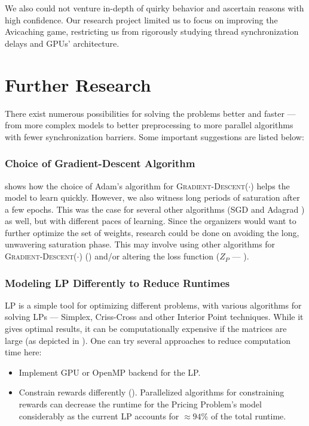 We also could not venture in-depth of quirky behavior and ascertain reasons with high confidence. Our research project limited us to focus on improving the Avicaching game, restricting us from rigorously studying thread synchronization delays and GPUs' architecture.

\section{Further Research}
There exist numerous possibilities for solving the problems better and faster --- from more complex models to better preprocessing to more parallel algorithms with fewer synchronization barriers. Some important suggestions are listed below:

\subsubsection{Choice of Gradient-Descent Algorithm}
 shows how the choice of Adam's algorithm \cite{Adam} for \textsc{Gradient-Descent}($\cdot$) helps the model to learn quickly. However, we also witness long periods of saturation after a few epochs. This was the case for several other algorithms (SGD \cite{SGD} and Adagrad \cite{Adagrad}) as well, but with different paces of learning. Since the organizers would want to further optimize the set of weights, research could be done on avoiding the long, unwavering saturation phase. This may involve using other algorithms for \textsc{Gradient-Descent}($\cdot$) () and/or altering the loss function ($Z_P$ --- ).

\subsubsection{Modeling LP Differently to Reduce Runtimes}
LP is a simple tool for optimizing different problems, with various algorithms for solving LPs --- Simplex, Criss-Cross and other Interior Point techniques. While it gives optimal results, it can be computationally expensive if the matrices are large (as depicted in ). One can try several approaches to reduce computation time here:
\begin{itemize}
    \item Implement GPU or OpenMP backend for the LP.
    \item Constrain rewards differently (). Parallelized algorithms for constraining rewards can decrease the runtime for the Pricing Problem's model considerably as the current LP accounts for $\approx 94\%$ of the total runtime.
\end{itemize}

